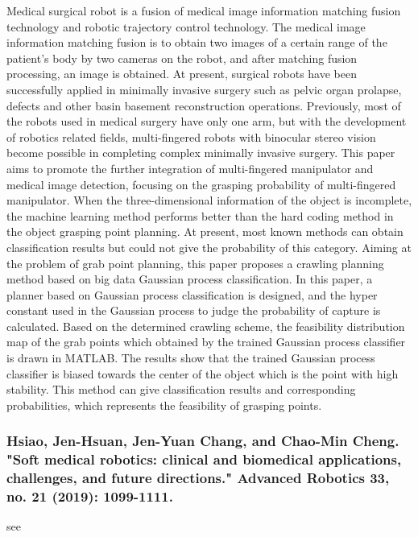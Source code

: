 \documentclass[conference]{IEEEtran}
\begin{document}
Medical surgical robot is a fusion of medical image information matching fusion technology and robotic trajectory control technology. The medical image information matching fusion is to obtain two images of a certain range of the patient’s body by two cameras on the robot, and after matching fusion processing, an image is obtained. At present, surgical robots have been successfully applied in minimally invasive surgery such as pelvic organ prolapse, defects and other basin basement reconstruction operations. Previously, most of the robots used in medical surgery have only one arm, but with the development of robotics related fields, multi-fingered robots with binocular stereo vision become possible in completing complex minimally invasive surgery. This paper aims to promote the further integration of multi-fingered manipulator and medical image detection, focusing on the grasping probability of multi-fingered manipulator. When the three-dimensional information of the object is incomplete, the machine learning method performs better than the hard coding method in the object grasping point planning. At present, most known methods can obtain classification results but could not give the probability of this category. Aiming at the problem of grab point planning, this paper proposes a crawling planning method based on big data Gaussian process classification. In this paper, a planner based on Gaussian process classification is designed, and the hyper constant used in the Gaussian process to judge the probability of capture is calculated. Based on the determined crawling scheme, the feasibility distribution map of the grab points which obtained by the trained Gaussian process classifier is drawn in MATLAB. The results show that the trained Gaussian process classifier is biased towards the center of the object which is the point with high stability. This method can give classification results and corresponding probabilities, which represents the feasibility of grasping points.

\medskip
\subsubsection{Hsiao, Jen-Hsuan, Jen-Yuan Chang, and Chao-Min Cheng. "Soft medical robotics: clinical and biomedical applications, challenges, and future directions." Advanced Robotics 33, no. 21 (2019): 1099-1111.}
see \cite{hsiao2019soft}
\end{document}
